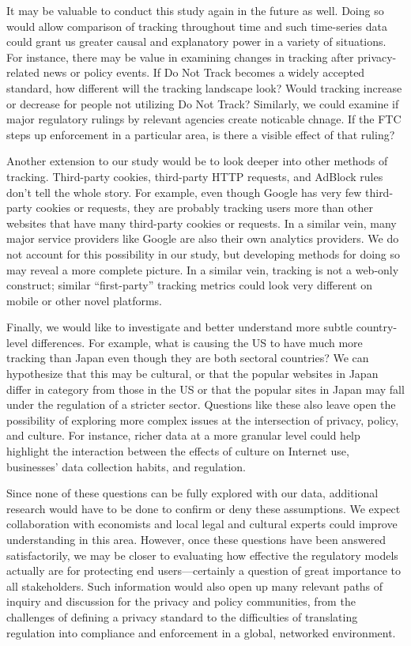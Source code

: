 \documentclass[conference]{IEEEtran}
\begin{document}
It may be valuable to conduct this study again in the future as well. Doing so would allow comparison of tracking throughout time and such time-series data could grant us greater causal and explanatory power in a variety of situations. For instance, there may be value in examining changes in tracking after privacy-related news or policy events. If Do Not Track becomes a widely accepted standard, how different will the tracking landscape look? Would tracking increase or decrease for people not utilizing Do Not Track? Similarly, we could examine if major regulatory rulings by relevant agencies create noticable chnage. If the FTC steps up enforcement in a particular area, is there a visible effect of that ruling?

Another extension to our study would be to look deeper into other methods of tracking. Third-party cookies, third-party HTTP requests, and AdBlock rules don't tell the whole story. For example, even though Google has very few third-party cookies or requests, they are probably tracking users more than other websites that have many third-party cookies or requests. In a similar vein, many major service providers like Google are also their own analytics providers. We do not account for this possibility in our study, but developing methods for doing so may reveal a more complete picture. In a similar vein, tracking is not a web-only construct; similar ``first-party'' tracking metrics could look very different on mobile or other novel platforms.

Finally, we would like to investigate and better understand more subtle country-level differences. For example, what is causing the US to have much more tracking than Japan even though they are both sectoral countries? We can hypothesize that this may be cultural, or that the popular websites in Japan differ in category from those in the US or that the popular sites in Japan may fall under the regulation of a stricter sector. Questions like these also leave open the possibility of exploring more complex issues at the intersection of privacy, policy, and culture. For instance, richer data at a more granular level could help highlight the interaction between the effects of culture on Internet use, businesses' data collection habits, and regulation.

Since none of these questions can be fully explored with our data, additional research would have to be done to confirm or deny these assumptions. We expect collaboration with economists and local legal and cultural experts could improve understanding in this area. However, once these questions have been answered satisfactorily, we may be closer to evaluating how effective the regulatory models actually are for protecting end users---certainly a question of great importance to all stakeholders. Such information would also open up many relevant paths of inquiry and discussion for the privacy and policy communities, from the challenges of defining a privacy standard to the difficulties of translating regulation into compliance and enforcement in a global, networked environment. 
\end{document}
